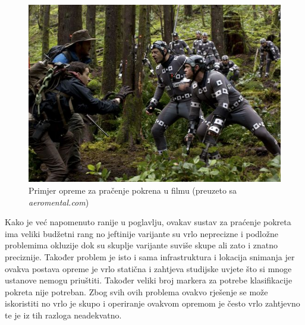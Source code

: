 \documentclass[times, utf8, diplomski]{fer}
\begin{document}
\begin{figure}[h!]
    \includegraphics[width=\textwidth]{planet.jpg}
    \caption{Primjer opreme za pračenje pokrena u filmu (preuzeto sa \textit{aeromental.com})}
    \label{planet}
\end{figure}

Kako je već napomenuto ranije u poglavlju, ovakav sustav za praćenje pokreta ima veliki budžetni rang no jeftinije varijante su
vrlo neprecizne i podložne problemima okluzije dok su skuplje varijante suviše skupe ali zato i znatno preciznije. Također problem
je isto i sama infrastruktura i lokacija snimanja jer ovakva postava opreme je vrlo statična i zahtjeva studijske uvjete što si mnoge
ustanove nemogu priuštiti. Također veliki broj markera za potrebe klasifikacije pokreta nije potreban. Zbog svih ovih problema ovakvo 
rješenje se može iskoristiti no vrlo je skupo i operiranje ovakvom opremom je često vrlo zahtjevno te je iz tih razloga neadekvatno.
\end{document}
